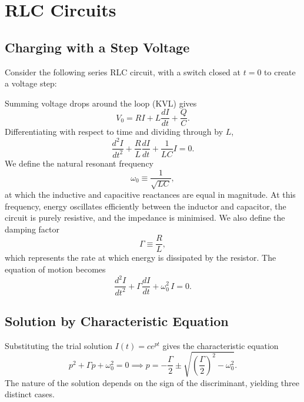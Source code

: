 \documentclass{article}
\begin{document}
\section{RLC Circuits}
\subsection{Charging with a Step Voltage}
Consider the following series RLC circuit, with a switch closed at $t = 0$ to create a voltage step:
\begin{center}
\end{center}
Summing voltage drops around the loop (KVL) gives
\[V_0 = RI + L\frac{dI}{dt} + \frac{Q}{C}.\]
Differentiating with respect to time and dividing through by $L$,
\[\frac{d^2I}{dt^2} + \frac{R}{L}\frac{dI}{dt} + \frac{1}{LC}I = 0.\]
We define the natural resonant frequency
\[\omega_0 \equiv \frac{1}{\sqrt{LC}},\]
at which the inductive and capacitive reactances are equal in magnitude. At this frequency, energy oscillates efficiently between the inductor and capacitor, the circuit is purely resistive, and the impedance is minimised. We also define the damping factor
\[\Gamma \equiv \frac{R}{L},\]
which represents the rate at which energy is dissipated by the resistor. The equation of motion becomes
\[\frac{d^2I}{dt^2} + \Gamma\frac{dI}{dt} + \omega_0^2\,I = 0.\]

\subsection{Solution by Characteristic Equation}
Substituting the trial solution $I(t) = ce^{pt}$ gives the characteristic equation
\[p^2 + \Gamma p + \omega_0^2 = 0 \implies p = -\frac{\Gamma}{2} \pm \sqrt{\left(\frac{\Gamma}{2}\right)^2 - \omega_0^2}.\]
The nature of the solution depends on the sign of the discriminant, yielding three distinct cases.
\end{document}
